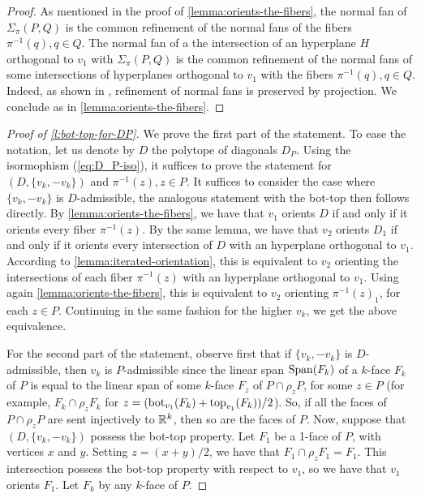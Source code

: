\begin{proof}
	As mentioned in the proof of \cref{lemma:orients-the-fibers}, the normal fan of $\Sigma_\pi(P,Q)$ is the common refinement of the normal fans of the fibers $\pi^{-1}(q), q \in Q$.
	The normal fan of a the intersection of an hyperplane $H$ orthogonal to $v_1$ with $\Sigma_\pi(P,Q)$ is the common refinement of the normal fans of some intersections of hyperplanes orthogonal to $v_1$ with the fibers $\pi^{-1}(q), q \in Q$.
	Indeed, as shown in \cite[Lemma 3.1]{BilleraSturmfels94}, refinement of normal fans is preserved by projection.
	We conclude as in \cref{lemma:orients-the-fibers}.
\end{proof}

\begin{proof}[Proof of \cref{l:bot-top-for-DP}]
	We prove the first part of the statement.
	To ease the notation, let us denote by $D$ the polytope of diagonals $D_P$.
	Using the isormophism (\ref{eq:D_P-iso}), it suffices to prove the statement for $(D,\{v_k,-v_k\})$ and $\pi^{-1}(z), z \in P$.
	It suffices to consider the case where $\{v_k,-v_k\}$ is $D$-admissible, the analogous statement with the bot-top then follows directly.
	By \cref{lemma:orients-the-fibers}, we have that $v_1$ orients $D$ if and only if it orients every fiber $\pi^{-1}(z)$.
	By the same lemma, we have that $v_2$ orients $D_1$ if and only if it orients every intersection of $D$ with an hyperplane orthogonal to $v_1$.
	According to \cref{lemma:iterated-orientation}, this is equivalent to $v_2$ orienting the intersections of each fiber $\pi^{-1}(z)$ with an hyperplane orthogonal to $v_1$.
	Using again \cref{lemma:orients-the-fibers}, this is equivalent to $v_2$ orienting $\pi^{-1}(z)_1$, for each $z \in P$.
	Continuing in the same fashion for the higher $v_k$, we get the above equivalence.

	For the second part of the statement, observe first that if $\{v_k,-v_k\}$ is $D$-admissible, then $v_k$ is $P$-admissible since the linear span $\operatorname{\mathrm{Span}}(F_k)$ of a $k$-face $F_k$ of $P$ is equal to the linear span of some $k$-face $F_z$ of $P\cap \rho_z P$, for some $z \in P$ (for example, $F_k \cap \rho_z F_k$ for $z=(\operatorname{bot}_{v_1}(F_k)+\operatorname{top}_{v_1}(F_k))/2$).
	So, if all the faces of $P\cap \rho_z P$ are sent injectively to $\mathbb{R}^k$, then so are the faces of $P$.
	Now, suppose that $(D,\{v_k,-v_k\})$ possess the bot-top property.
	Let $F_1$ be a 1-face of $P$, with vertices $x$ and $y$.
	Setting $z=(x+y)/2$, we have that $F_1 \cap \rho_z F_1 = F_1$.
	This intersection possess the bot-top property with respect to $v_1$, so we have that $v_1$ orients $F_1$.
	Let $F_k$ by any $k$-face of $P$. 
\end{proof}






